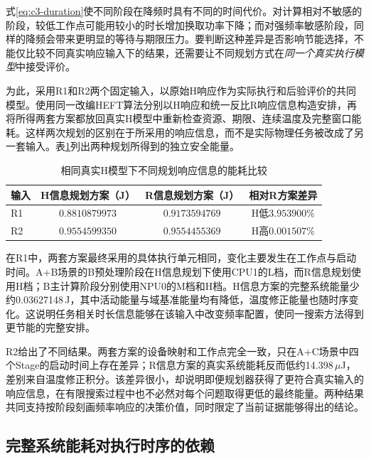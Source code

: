式\eqref{eq:c3-duration}使不同阶段在降频时具有不同的时间代价。对计算相对不敏感的阶段，较低工作点可能用较小的时长增加换取功率下降；而对强频率敏感阶段，同样的降频会带来更明显的等待与期限压力。要判断这种差异是否影响节能选择，不能仅比较不同真实响应输入下的结果，还需要让不同规划方式在\emph{同一个真实执行模型}中接受评价。

为此，采用R1和R2两个固定输入，以原始H响应作为实际执行和后验评价的共同模型。使用同一改编HEFT算法分别以H响应和统一反比R响应信息构造安排，再将所得两套方案都放回真实H模型中重新检查资源、期限、连续温度及完整窗口能耗。这样两次规划的区别在于所采用的响应信息，而不是实际物理任务被改成了另一套输入。表\ref{tab:c3-response-evidence}列出两种规划所得到的独立安全能量。

\begin{table}[htbp]
 \centering
 \caption{相同真实H模型下不同规划响应信息的能耗比较}
 \label{tab:c3-response-evidence}
 \begin{tabular}{lccc}
 \toprule
 输入 & H信息规划方案（J） & R信息规划方案（J） & 相对R方案差异\\
 \midrule
 R1 & $0.8810879973$ & $0.9173594769$ & H低$3.953900\%$\\
 R2 & $0.9554599350$ & $0.9554455369$ & H高$0.001507\%$\\
 \bottomrule
 \end{tabular}
\end{table}

在R1中，两套方案最终采用的具体执行单元相同，变化主要发生在工作点与启动时间。A+B场景的B预处理阶段在H信息规划下使用CPU1的L档，而R信息规划使用H档；B主计算阶段分别使用NPU0的M档和H档。H信息方案的完整系统能量少约0.03627148\,J，其中活动能量与域基准能量均有降低，温度修正能量也随时序变化。这说明任务相关时长信息能够在该输入中改变频率配置，使同一搜索方法得到更节能的完整安排。

R2给出了不同结果。两套方案的设备映射和工作点完全一致，只在A+C场景中四个Stage的启动时间上存在差异；R信息方案的真实系统能耗反而低约14.398\,$\mu$J，差别来自温度修正积分。该差异很小，却说明即便规划器获得了更符合真实输入的响应信息，在有限搜索过程中也不必然对每个问题取得更低的最终能量。两种结果共同支持按阶段刻画频率响应的决策价值，同时限定了当前证据能够得出的结论。


\subsection{完整系统能耗对执行时序的依赖}

